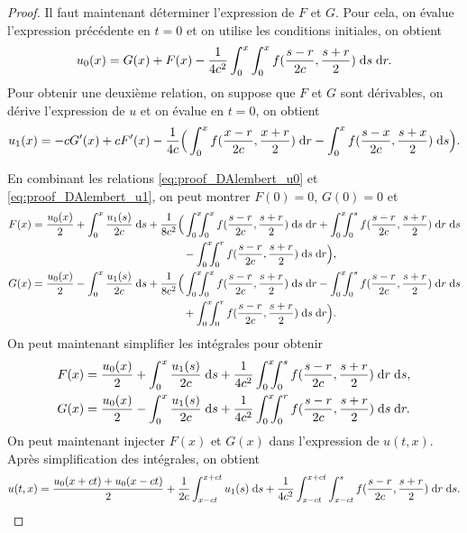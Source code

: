 \documentclass[12pt,a4paper,twoside]{article}
\begin{document}
\begin{proof}
  Il faut maintenant d\'eterminer l'expression de $F$ et $G$.
  Pour cela, on \'evalue l'expression pr\'ec\'edente en $t=0$ et on utilise
  les conditions initiales, on obtient
  \begin{align}
    \label{eq:proof_DAlembert_u0}
    u_0(x) = G(x) + F(x) - \dfrac{1}{4c^2} \int_{0}^{x} \int_0^{x} f(\dfrac{s-r}{2c} , \dfrac{s+r}{2})
    \;\mathrm{d} s \;\mathrm{d} r .
  \end{align}
  Pour obtenir une deuxi\`eme relation, on suppose que $F$ et $G$ sont
  d\'erivables, on d\'erive l'expression de $u$ et on \'evalue en $t=0$,
  on obtient
  \begin{align}
    \label{eq:proof_DAlembert_u1}
    u_1(x) = - c G'(x) + c F'(x) - \dfrac{1}{4c} \Big( 
    \int_{0}^x f(\dfrac{x-r}{2c},\dfrac{x+r}{2}) \;\mathrm{d} r
    - \int_0^x f(\dfrac{s-x}{2c},\dfrac{s+x}{2}) \;\mathrm{d} s
    \Big) .
  \end{align}

  En combinant les relations \eqref{eq:proof_DAlembert_u0}
  et \eqref{eq:proof_DAlembert_u1}, on peut montrer
  $F(0) = 0$, $G(0) = 0$ et
  \begin{align*}
    F(x) &= \dfrac{u_0(x)}{2} + \int_{0}^{x} \dfrac{u_1(s)}{2c} \deriv s
    + \dfrac{1}{8c^2} \Big(
    \int_0^x \!\!\!\int_0^x f(\dfrac{s-r}{2c} , \dfrac{s+r}{2} ) \deriv s \deriv r
    + \int_0^x \!\!\!\int_0^s f(\dfrac{s-r}{2c} , \dfrac{s+r}{2} ) \deriv r \deriv s
    \\
    & \qquad \qquad \qquad \qquad \qquad \qquad \qquad 
      - \int_0^x \!\!\!\int_0^r f(\dfrac{s-r}{2c} , \dfrac{s+r}{2} ) \deriv s \deriv r
    \Big) ,
    \\
    G(x) &= \dfrac{u_0(x)}{2} - \int_{0}^{x} \dfrac{u_1(s)}{2c} \deriv s
    + \dfrac{1}{8c^2} \Big(
    \int_0^x \!\!\!\int_0^x f(\dfrac{s-r}{2c} , \dfrac{s+r}{2} ) \deriv s \deriv r
    - \int_0^x \!\!\!\int_0^s f(\dfrac{s-r}{2c} , \dfrac{s+r}{2} ) \deriv r \deriv s
    \\
    & \qquad \qquad \qquad \qquad \qquad \qquad \qquad 
      + \int_0^x \!\!\!\int_0^r f(\dfrac{s-r}{2c} , \dfrac{s+r}{2} ) \deriv s \deriv r
    \Big) .
  \end{align*}
  On peut maintenant simplifier les int\'egrales pour obtenir
  \begin{align*}
    F(x) &= \dfrac{u_0(x)}{2} + \int_{0}^{x} \dfrac{u_1(s)}{2c} \;\mathrm{d} s
           + \dfrac{1}{4c^2} 
           \int_0^x \!\!\!\int_0^s f(\dfrac{s-r}{2c} , \dfrac{s+r}{2} ) \;\mathrm{d} r \;\mathrm{d} s ,
    \\
    G(x) &= \dfrac{u_0(x)}{2} - \int_{0}^{x} \dfrac{u_1(s)}{2c} \;\mathrm{d} s
           + \dfrac{1}{4c^2}
           \int_0^x \!\!\!\int_0^r f(\dfrac{s-r}{2c} , \dfrac{s+r}{2} ) \;\mathrm{d} s \;\mathrm{d} r .
  \end{align*}
  On peut maintenant injecter $F(x)$ et $G(x)$ dans l'expression de $u(t,x)$.
  Apr\`es simplification des int\'egrales, on obtient
  \begin{align*}
    u(t,x) = \dfrac{u_0(x+ct) + u_0(x-ct)}{2} + \dfrac{1}{2c} \int_{x-ct}^{x+ct} u_1(s) \;\mathrm{d} s
    + \dfrac{1}{4c^2} \int_{x-ct}^{x+ct} \int_{x-ct}^{s} f(\dfrac{s-r}{2c} , \dfrac{s+r}{2})
    \;\mathrm{d} r \;\mathrm{d} s .
  \end{align*}


\end{proof}
\end{document}
